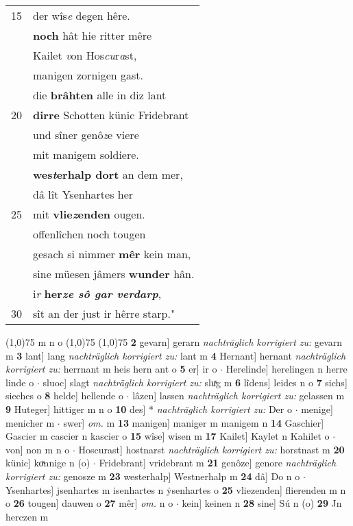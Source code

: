 \documentclass[8pt,a4paper,notitlepage]{article}
\begin{document}
\begin{table}[ht]
\begin{minipage}[t]{0.5\linewidth}
\begin{tabular}{rl}
15 & der wîs\textit{e} degen hêre.\\ 
 & \textbf{noch} hât hie ritter mêre\\ 
 & Kailet \textit{v}on Hos\textit{cu}r\textit{a}st,\\ 
 & manigen zornigen gast.\\ 
 & die \textbf{brâhten} alle in diz lant\\ 
20 & \textbf{dirre} Schotten künic Fridebrant\\ 
 & und sîner genô\textit{z}e viere\\ 
 & mit manigem soldiere.\\ 
 & \textbf{wes\textit{t}erhalp dort} an dem mer,\\ 
 & dâ lît Ysenhartes her\\ 
25 & mit \textbf{vlie\textit{z}enden} ougen.\\ 
 & offenlîchen noch tougen\\ 
 & gesach si nimmer \textbf{mêr} kein man,\\ 
 & sine müesen jâmers \textbf{wunder} hân.\\ 
 & i\textit{r} \textbf{her\textit{ze sô gar verdarp}},\\ 
30 & sît an der just ir hêrre starp."\\ 
\end{tabular}
\scriptsize
\line(1,0){75} \newline
m n o \newline
\line(1,0){75} \newline
\newline
\line(1,0){75} \newline
\textbf{2} gevarn] gerarn \textit{nachträglich korrigiert zu:} gevarn m \textbf{3} lant] lang \textit{nachträglich korrigiert zu:} lant m \textbf{4} Hernant] hernant \textit{nachträglich korrigiert zu:} herrnant m heis hern ant o \textbf{5} er] ir o  $\cdot$ Herelinde] herelingen n herre linde o  $\cdot$ sluoc] slagt \textit{nachträglich korrigiert zu:} sluͯg m \textbf{6} lîdens] leides n o \textbf{7} sichs] sieches o \textbf{8} helde] hellende o  $\cdot$ lâzen] lassen \textit{nachträglich korrigiert zu:} gelassen m \textbf{9} Huteger] hittiger m n o \textbf{10} des] * \textit{nachträglich korrigiert zu:} Der o  $\cdot$ menige] menicher m  $\cdot$ swer] \textit{om.} m \textbf{13} manigen] maniger m manigem n \textbf{14} Gaschier] Gascier m cascier n kascier o \textbf{15} wîse] wisen m \textbf{17} Kailet] Kaylet n Kahilet o  $\cdot$ von] non m n o  $\cdot$ Hoscurast] hostnarst \textit{nachträglich korrigiert zu:} horstnast m \textbf{20} künic] koͯnnige n (o)  $\cdot$ Fridebrant] vridebrant m \textbf{21} genôze] genore \textit{nachträglich korrigiert zu:} genosze m \textbf{23} westerhalp] Westnerhalp m \textbf{24} dâ] Do n o  $\cdot$ Ysenhartes] jsenhartes m isenhartes n ẏsenhartes o \textbf{25} vliezenden] flierenden m n o \textbf{26} tougen] dauwen o \textbf{27} mêr] \textit{om.} n o  $\cdot$ kein] keinen n \textbf{28} sine] Sú n (o) \textbf{29} Jn herczen m \newline
\end{minipage}
\end{table}
\end{document}
